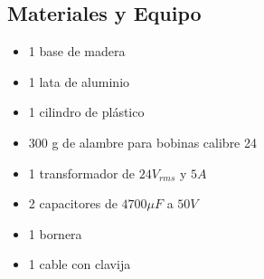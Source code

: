 \subsection{Materiales y Equipo}
\begin{multicols}{2}
\begin{itemize}
 \item 1 base de madera
 \item 1 lata de aluminio
 \item 1 cilindro de pl\'astico
 \item 300 g de alambre para bobinas calibre 24
 \item 1 transformador de $24 V_{rms}$ y $5 A$
 \item 2 capacitores de $4700 \mu F$ a $50 V$
 \item 1 bornera
 \item 1 cable con clavija
\end{itemize}
\end{multicols}

